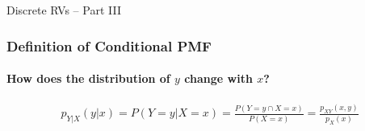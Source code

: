 \documentclass[handout]{beamer}
\date{Lecture \# 9}
\begin{document}
 


\begin{frame}[plain]
	\titlepage 
	

\end{frame} 


\begin{frame}
\centering \Huge Discrete RVs -- Part III

\end{frame}


%
%
%
%
%
%
%
\begin{frame}
\frametitle{Definition of Conditional PMF}
\framesubtitle{How does the distribution of $y$ change with $x$?}

\begin{eqnarray*}
	p_{Y|X}(y|x) = P(Y=y|X=x) =  \frac{P(Y=y \cap X=x)}{P(X=x)} =  \frac{p_{XY}(x,y)}{p_X(x)}
\end{eqnarray*}
\vspace{1em}


\end{frame}
\end{document}
